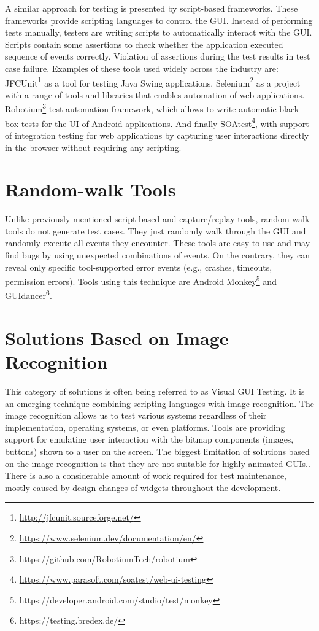 A similar approach for testing is presented by script-based frameworks. These frameworks provide scripting languages to control the GUI. Instead of performing tests manually, testers are writing scripts to automatically interact with the GUI. Scripts contain some assertions to check whether the application executed sequence of events correctly. Violation of assertions during the test results in test case failure. Examples of these tools used widely across the industry are: JFCUnit\footnote{\url{http://jfcunit.sourceforge.net/}} as a tool for testing Java Swing applications. Selenium\footnote{\url{https://www.selenium.dev/documentation/en/}} as a project with a range of tools and libraries that enables automation of web applications. Robotium\footnote{\url{https://github.com/RobotiumTech/robotium}} test automation framework, which allows to write automatic black-box tests for the UI of Android applications. And finally SOAtest\footnote{\url{https://www.parasoft.com/soatest/web-ui-testing}}, with support of integration testing for web applications by capturing user interactions directly in the browser without requiring any scripting.\cite{NguyenBao2014Gait}

\section{Random-walk Tools}
Unlike previously mentioned script-based and capture/replay tools, random-walk tools do not generate test cases. They just randomly walk through the GUI and randomly execute all events they encounter. These tools are easy to use and may find bugs by using unexpected combinations of events. On the contrary, they can reveal only specific tool-supported error events (e.g., crashes, timeouts, permission errors). Tools using this technique are Android Monkey\footnote{https://developer.android.com/studio/test/monkey} and GUIdancer\footnote{https://testing.bredex.de/}.

\section{Solutions Based on Image Recognition}
This category of solutions is often being referred to as Visual GUI Testing. It is an emerging technique combining scripting languages with image recognition. The image recognition allows us to test various systems regardless of their implementation, operating systems, or even platforms. Tools are providing support for emulating user interaction with the bitmap components (images, buttons) shown to a user on the screen. The biggest limitation of solutions based on the image recognition is that they are not suitable for highly animated GUIs.\cite{guitesting}. There is also a considerable amount of work required for test maintenance, mostly caused by design changes of widgets throughout the development.   

